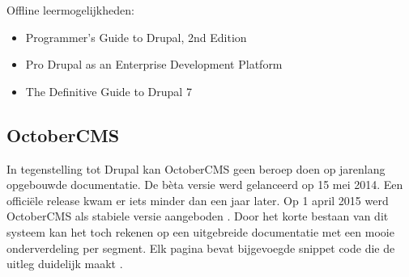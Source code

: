 Offline leermogelijkheden: \cite{Drupal2016DrupalMarketplace}
\begin{itemize}
  \item{Programmer's Guide to Drupal, 2nd Edition}
  \item{Pro Drupal as an Enterprise Development Platform}
  \item{The Definitive Guide to Drupal 7}
\end{itemize}

\subsection{OctoberCMS}
In tegenstelling tot Drupal kan OctoberCMS geen beroep doen op jarenlang opgebouwde documentatie. De bèta versie werd gelanceerd op 15 mei 2014. Een officiële release kwam er iets minder dan een jaar later. Op 1 april 2015 werd OctoberCMS als stabiele versie aangeboden \citep{BobkovAlexeyPUTTINGWORDS}.
\newline\newline
Door het korte bestaan van dit systeem kan het toch rekenen op een uitgebreide documentatie met een mooie onderverdeling per segment. Elk pagina bevat bijgevoegde snippet code die de uitleg duidelijk maakt \citep{BobkovAlexey2016OctoberCMSDocumentation}. 

